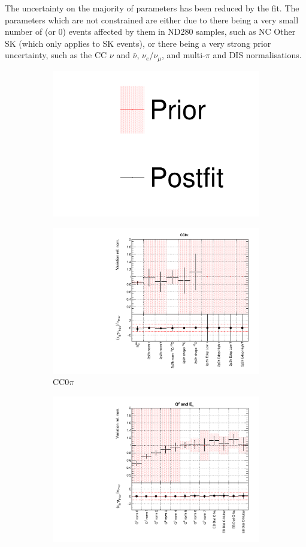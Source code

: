 The uncertainty on the majority of parameters has been reduced by the fit. The parameters which are not constrained are either due to there being a very small number of (or 0) events affected by them in ND280 samples, such as NC Other SK (which only applies to SK events), or there being a very strong prior uncertainty, such as the CC $\nu$ and $\bar{\nu}$, $\nu_e$/$\nu_{\mu}$, and multi-$\pi$ and DIS normalisations.

\begin{figure}[!htbp]
\centering
\begin{subfigure}{0.8\textwidth}
  \centering
  \includegraphics[width=0.25\linewidth]{figs/asmv_leg}
\end{subfigure}
\begin{subfigure}{0.49\textwidth}
  \centering
  \includegraphics[width=0.9\linewidth]{figs/asmvxsecpoly1}
  \caption{CC0$\pi$}
\end{subfigure}
\begin{subfigure}{0.49\textwidth}
  \centering
  \includegraphics[width=0.9\linewidth]{figs/asmvxsecpoly2}

\end{subfigure}
\end{figure}
